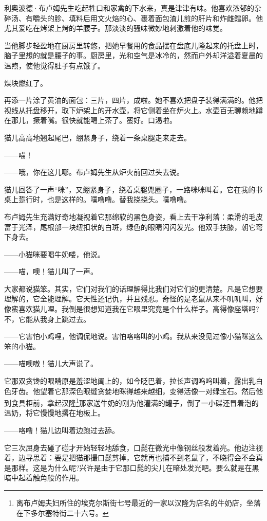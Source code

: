 \par 利奥波德·布卢姆先生吃起牲口和家禽的下水来，真是津津有味。他喜欢浓郁的杂碎汤、有嚼头的胗、填料后用文火焙的心、裹着面包渣儿煎的肝片和炸雌鳕卵。他尤其爱吃在烤架上烤的羊腰子。那淡淡的骚味微妙地刺激着他的味觉。
\par 当他脚步轻盈地在厨房里转悠，把她早餐用的食品摆在盘底儿隆起来的托盘上时，脑子里想的就是腰子的事。厨房里，光和空气是冰冷的，然而户外却洋溢着夏晨的温煦，使他觉得肚子有点饿了。
\par 煤块燃红了。
\par 再添一片涂了黄油的面包：三片，四片，成啦。她不喜欢把盘子装得满满的。他把视线从托盘移开，取下炉架上的开水壶，将它侧着坐在炉火上。水壶百无聊赖地蹲在那儿，撅着嘴。很快就能喝上茶了。蛮好。口渴啦。
\par 猫儿高高地翘起尾巴，绷紧身子，绕着一条桌腿走来走去。
\par ——喵！
\par ——哦，你在这儿哪。布卢姆先生从炉火前回过头去说。
\par 猫儿回答了一声“咪”，又绷紧身子，绕着桌腿兜圈子，一路咪咪叫着。它在我的书桌上踅行时，也是这样的。噗噜噜。替我挠挠头。噗噜噜。
\par 布卢姆先生充满好奇地凝视着它那绵软的黑色身姿，看上去干净利落：柔滑的毛皮富于光泽，尾根部一块纽扣状的白斑，绿色的眼睛闪闪发光。他双手扶膝，朝它弯下身去。
\par ——小猫咪要喝牛奶喽，他说。
\par ——喵，噢！猫儿叫了一声。
\par 大家都说猫笨。其实，它们对我们的话理解得比我们对它们的更清楚。凡是它想要理解的，它全能理解。它天性还记仇，并且残忍。奇怪的是老鼠从来不叽叽叫，好像蛮喜欢猫儿哩。我倒是很想知道我在它眼里究竟是个什么样子。高得像座塔吗?不，它能从我身上跳过去。
\par ——它害怕小鸡哩，他调侃地说。害怕咯咯叫的小鸡。我从来没见过像小猫咪这么笨的小猫。
\par ——喵噢嗷！猫儿大声说了。
\par 它那双贪馋的眼睛原是羞涩地阖上的，如今眨巴着，拉长声调呜呜叫着，露出乳白色牙齿。他望着它那深色眼缝贪婪地眯得越来越细，变得活像一对绿宝石。然后他到食具柜前，拿起汉隆\footnote{离布卢姆夫妇所住的埃克尔斯街七号最近的一家以汉隆为店名的牛奶店，坐落在下多尔塞特街二十六号。}那家送牛奶的刚为他灌满的罐子，倒了一小碟还冒着泡的温奶，将它慢慢地撂在地板上。
\par ——咯噜！猫儿边叫着边跑过去舔。
\par 它三次屈身去碰了碰才开始轻轻地舔食，口髭在微光中像钢丝般发着亮。他边注视着，边寻思着：要是把猫那撮口髭剪掉，它就再也捕不到老鼠了，不晓得会不会真是那样。这是为什么呢?兴许是由于它那口髭的尖儿在暗处发光吧。要么就是在黑暗中起着触角般的作用。
